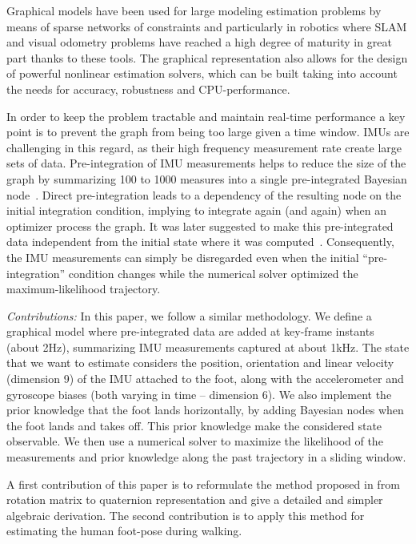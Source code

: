 Graphical models have been used for large modeling estimation problems by means of sparse networks of constraints and particularly in
robotics where SLAM and visual odometry problems have reached a high degree of maturity in great part thanks to these tools.
The graphical representation also allows for the design of powerful nonlinear estimation solvers, which can be built taking into account the needs for accuracy, 
robustness and CPU-performance.

In order to keep the problem tractable and maintain real-time performance a key point is to prevent the graph from being too large given a time window.
IMUs are challenging in this regard, as their high frequency measurement rate create large sets of data. 
Pre-integration of IMU measurements helps to reduce the size of the graph by summarizing 100 to 1000 measures into a single pre-integrated Bayesian node~\cite{LUPTON-09}.
Direct pre-integration leads to a dependency of the resulting node on the initial integration condition, implying to integrate again (and again) when an optimizer process the graph.
It was later suggested to make this pre-integrated data independent from the initial state where it was computed~\cite{forster2015imu}.
Consequently, the IMU measurements can simply be disregarded even when the initial ``pre-integration'' condition changes while the numerical solver optimized the maximum-likelihood trajectory.

\textit{Contributions: }
In this paper, we follow a similar methodology. We define a graphical model where pre-integrated data are added at key-frame instants (about 2Hz), summarizing IMU measurements captured at about 1kHz.
The state that we want to estimate considers the position, orientation and linear velocity (dimension 9) of the IMU attached to the foot, along with the accelerometer and gyroscope biases (both varying in time -- dimension 6).
We also implement the prior knowledge that the foot lands horizontally, by adding Bayesian nodes when the foot lands and takes off.
This prior knowledge make the considered state observable. 
We then use a numerical solver to maximize the likelihood of the measurements and prior knowledge along the past trajectory in a sliding window. 

A first contribution of this paper is to reformulate the method proposed in \cite{forster2015imu} from rotation matrix to quaternion representation
and give a detailed and simpler algebraic derivation.
The second contribution is to apply this method for estimating the human foot-pose during walking.

